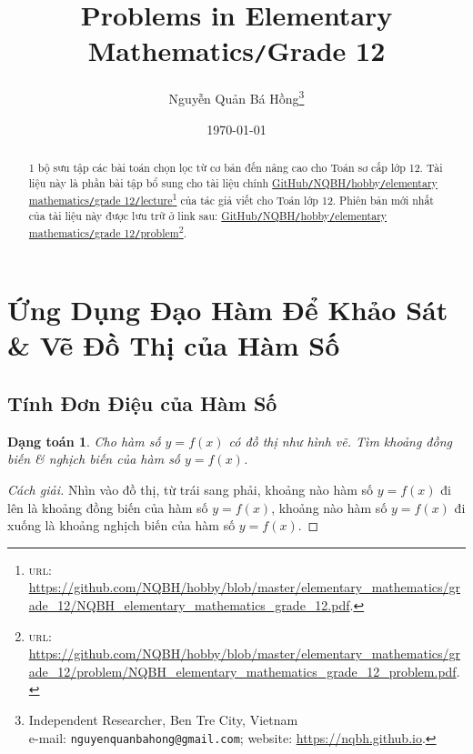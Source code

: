 \documentclass[12pt]{article}
\title{Problems in Elementary Mathematics\texttt{/}Grade 12}
\author{Nguyễn Quản Bá Hồng\footnote{Independent Researcher, Ben Tre City, Vietnam\\e-mail: \texttt{nguyenquanbahong@gmail.com}; website: \url{https://nqbh.github.io}.}}
\date{\today}
\numberwithin{equation}{section}
\newtheorem{dangtoan}{Dạng toán}[section]
\begin{document}
\maketitle
\begin{abstract}
	1 bộ sưu tập các bài toán chọn lọc từ cơ bản đến nâng cao cho Toán sơ cấp lớp 12. Tài liệu này là phần bài tập bổ sung cho tài liệu chính \href{https://github.com/NQBH/hobby/blob/master/elementary_mathematics/grade_12/NQBH_elementary_mathematics_grade_12.pdf}{GitHub\texttt{/}NQBH\texttt{/}hobby\texttt{/}elementary mathematics\texttt{/}grade 12\texttt{/}lecture}\footnote{\textsc{url}: \url{https://github.com/NQBH/hobby/blob/master/elementary_mathematics/grade_12/NQBH_elementary_mathematics_grade_12.pdf}.} của tác giả viết cho Toán lớp 12. Phiên bản mới nhất của tài liệu này được lưu trữ ở link sau: \href{https://github.com/NQBH/hobby/blob/master/elementary_mathematics/grade_12/problem/NQBH_elementary_mathematics_grade_12_problem.pdf}{GitHub\texttt{/}NQBH\texttt{/}hobby\texttt{/}elementary mathematics\texttt{/}grade 12\texttt{/}problem}\footnote{\textsc{url}: \url{https://github.com/NQBH/hobby/blob/master/elementary_mathematics/grade_12/problem/NQBH_elementary_mathematics_grade_12_problem.pdf}.}.
\end{abstract}
\tableofcontents
\newpage


\section{Ứng Dụng Đạo Hàm Để Khảo Sát \& Vẽ Đồ Thị của Hàm Số}

\subsection{Tính Đơn Điệu của Hàm Số}
\begin{dangtoan}
	Cho hàm số $y = f(x)$ có đồ thị như hình vẽ. Tìm khoảng đồng biến \& nghịch biến của hàm số $y = f(x)$.
\end{dangtoan}

\begin{proof}[Cách giải]
	Nhìn vào đồ thị, từ trái sang phải, khoảng nào hàm số $y = f(x)$ đi lên là khoảng đồng biến của hàm số $y = f(x)$, khoảng nào hàm số $y = f(x)$ đi xuống là khoảng nghịch biến của hàm số $y = f(x)$.
\end{proof}

\end{document}

